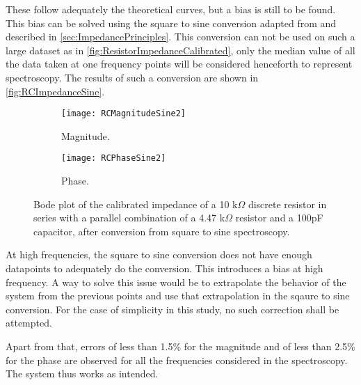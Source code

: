 These follow adequately the theoretical curves, but a bias is still to be found. This bias can be solved using the square to sine conversion adapted from \citep{Subhan2019} and described in \autoref{sec:ImpedancePrinciples}. This conversion can not be used on such a large dataset as in \autoref{fig:ResistorImpedanceCalibrated}, only the median value of all the data taken at one frequency points will be considered henceforth to represent spectroscopy. The results of such a conversion are shown in \autoref{fig:RCImpedanceSine}. \par
\begin{figure}[h]
\centering
\begin{subfigure}{0.99\textwidth}
\centering
    \texttt{[image: RCMagnitudeSine2]}
    \caption{Magnitude.}
    \label{fig:RCSineMagnitude2}
\end{subfigure}
\begin{subfigure}{0.99\textwidth}
\centering
    \texttt{[image: RCPhaseSine2]}
    \caption{Phase.}
    \label{fig:RCPhaseSine2}
\end{subfigure}
\caption{Bode plot of the calibrated impedance of a 10 k$\Omega$ discrete resistor in series with a parallel combination of a 4.47 k$\Omega$ resistor and a 100pF capacitor, after conversion from square to sine spectroscopy.}
\label{fig:RCImpedanceSine}
\end{figure}
At high frequencies, the square to sine conversion does not have enough datapoints to adequately do the conversion. This introduces a bias at high frequency. A way to solve this issue would be to extrapolate the behavior of the system from the previous points and use that extrapolation in the sqaure to sine conversion. For the case of simplicity in this study, no such correction shall be attempted.  \par

Apart from that, errors of less than 1.5\% for the magnitude and of less than 2.5\% for the phase are observed for all the frequencies considered in the spectroscopy. The system thus works as intended. \par